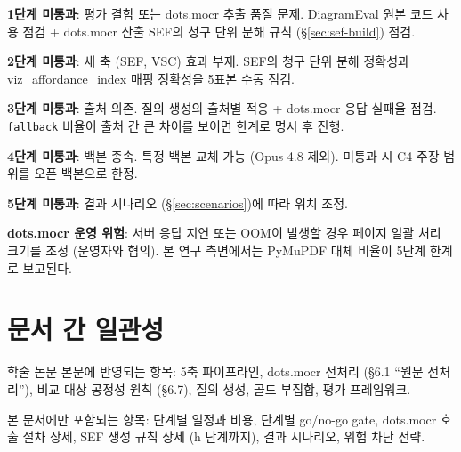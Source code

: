 \documentclass[11pt]{article}
\begin{document}
\textbf{1단계 미통과}: 평가 결함 또는 dots.mocr 추출 품질 문제. DiagramEval 원본 코드 사용 점검 + dots.mocr 산출 SEF의 청구 단위 분해 규칙 (\S \ref{sec:sef-build}) 점검.

\textbf{2단계 미통과}: 새 축 (SEF, VSC) 효과 부재. SEF의 청구 단위 분해 정확성과 viz\_affordance\_index 매핑 정확성을 5표본 수동 점검.

\textbf{3단계 미통과}: 출처 의존. 질의 생성의 출처별 적응 + dots.mocr 응답 실패율 점검. \texttt{fallback} 비율이 출처 간 큰 차이를 보이면 한계로 명시 후 진행.

\textbf{4단계 미통과}: 백본 종속. 특정 백본 교체 가능 (Opus 4.8 제외). 미통과 시 C4 주장 범위를 오픈 백본으로 한정.

\textbf{5단계 미통과}: 결과 시나리오 (\S \ref{sec:scenarios})에 따라 위치 조정.

\textbf{dots.mocr 운영 위험}: 서버 응답 지연 또는 OOM이 발생할 경우 페이지 일괄 처리 크기를 조정 (운영자와 협의). 본 연구 측면에서는 PyMuPDF 대체 비율이 5단계 한계로 보고된다.

\section{문서 간 일관성}

학술 논문 본문에 반영되는 항목: 5축 파이프라인, dots.mocr 전처리 (\S 6.1 ``원문 전처리''), 비교 대상 공정성 원칙 (\S 6.7), 질의 생성, 골드 부집합, 평가 프레임워크.

본 문서에만 포함되는 항목: 단계별 일정과 비용, 단계별 go/no-go gate, dots.mocr 호출 절차 상세, SEF 생성 규칙 상세 (h 단계까지), 결과 시나리오, 위험 차단 전략.
\end{document}
